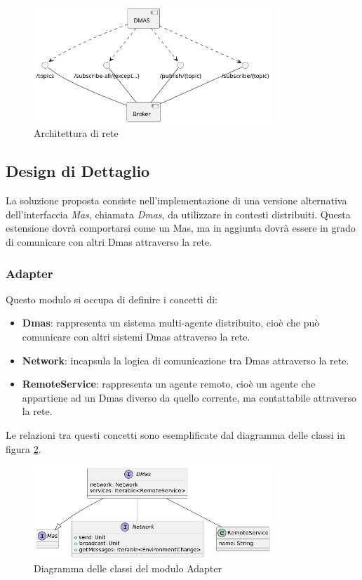 \begin{figure}[ht!]
    \centering
    \includegraphics[width=0.8\textwidth]{figures/network-architecture.png}
    \caption{Architettura di rete}
    \label{fig:network-architecture}
\end{figure}

\subsection{Design di Dettaglio}
La soluzione proposta consiste nell'implementazione di una versione alternativa dell'interfaccia \textit{Mas}, chiamata \textit{Dmas}, da utilizzare in contesti distribuiti.
Questa estensione dovrà comportarsi come un Mas, ma in aggiunta dovrà essere in grado di comunicare con altri Dmas attraverso la rete.

\subsubsection{Adapter}
Questo modulo si occupa di definire i concetti di:
\begin{itemize}
    \item \textbf{Dmas}: rappresenta un sistema multi-agente distribuito, cioè che può comunicare con altri sistemi Dmas attraverso la rete.
    \item \textbf{Network}: incapsula la logica di comunicazione tra Dmas attraverso la rete.
    \item \textbf{RemoteService}: rappresenta un agente remoto, cioè un agente che appartiene ad un Dmas diverso da quello corrente, ma contattabile attraverso la rete.
\end{itemize}

Le relazioni tra questi concetti sono esemplificate dal diagramma delle classi in figura \ref{fig:class-dmas}.

\begin{figure}[ht!]
    \centering
    \includegraphics[width=0.8\textwidth]{figures/class-dmas.png}
    \caption{Diagramma delle classi del modulo Adapter}
    \label{fig:class-dmas}
\end{figure}

